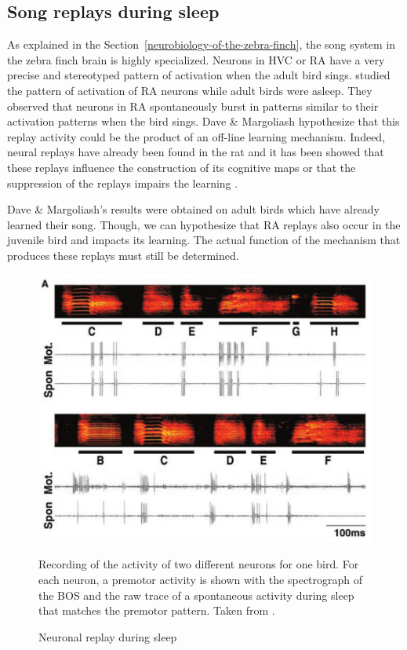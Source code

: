 \documentclass{report}
\begin{document}
\subsection{Song replays during sleep}
\label{song-replays-sleep}

As explained in the Section~\ref{neurobiology-of-the-zebra-finch}, the song
system in the zebra finch brain is highly specialized. Neurons in HVC or RA have
a very precise and stereotyped pattern of activation when the adult bird sings.
\textcite{dave_song_2000} studied the pattern of activation of RA neurons while
adult birds were asleep. They observed that neurons in RA spontaneously burst in
patterns similar to their activation patterns when the bird sings. Dave \&
Margoliash hypothesize that this replay activity could be the product of an
off-line learning mechanism. Indeed, neural replays have already been found in
the rat and it has been showed that these replays influence the construction of
its cognitive maps \parencite{de_lavilleon_explicit_2015} or that the
suppression of the replays impairs the learning
\parencite{girardeau_selective_2009}.

Dave \& Margoliash's results were obtained on adult birds which have already
learned their song. Though, we can hypothesize that RA replays also occur in the
juvenile bird and impacts its learning. The actual function of the mechanism
that produces these replays must still be determined.

\begin{figure}[tbph]
  {\center
  \includegraphics[width=0.7\linewidth]{media/replays_bird_margoliash}
  \caption{Neuronal replay during sleep}
  }
  \small
  Recording of the activity of two different neurons for one bird. For each
  neuron, a premotor activity is shown with the spectrograph of the BOS and the raw trace of a spontaneous activity during sleep that
  matches the premotor pattern. Taken from \textcite{dave_song_2000}.

\end{figure}
\end{document}
